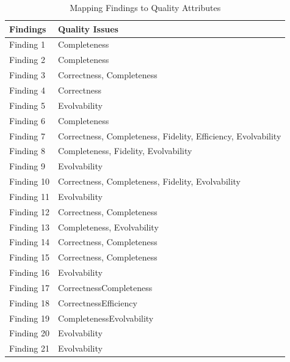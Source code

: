\documentclass{llncs}
\begin{document}
    
    \begin{table}[h!]
        \begin{center}
          \caption{Mapping Findings to Quality Attributes}
          \label{tab:Mapping}
          \begin{tabular}{l@{\hspace{1cm}}l} 
            \textbf{Findings} & \textbf{Quality Issues}\\
            \hline
            Finding 1 &     Completeness\\
            Finding 2 &     Completeness\\
            Finding 3 &     Correctness, Completeness\\
            Finding 4 &     Correctness\\
            Finding 5 &     Evolvability\\
            Finding 6 &     Completeness\\
            Finding 7 &     Correctness, Completeness, Fidelity, Efficiency, Evolvability\\
            Finding 8 &     Completeness, Fidelity, Evolvability\\
            Finding 9 &     Evolvability\\
            Finding 10 &    Correctness, Completeness, Fidelity, Evolvability\\
            Finding 11 &    Evolvability\\
            Finding 12 &    Correctness, Completeness\\
            Finding 13 &    Completeness, Evolvability\\
            Finding 14 &    Correctness, Completeness\\
            Finding 15 &    Correctness, Completeness\\
            Finding 16 &    Evolvability \\
      Finding 17&CorrectnessCompleteness \\
      Finding 18&CorrectnessEfficiency \\
      Finding 19&CompletenessEvolvability \\
      Finding 20&Evolvability \\
      Finding 21&Evolvability 
    \end{tabular}
    \end{center}
    \end{table}
\end{document}
